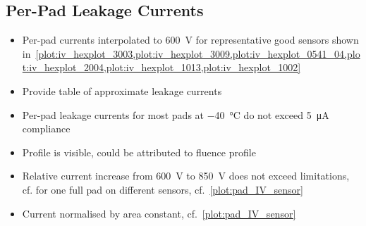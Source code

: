 \subsection{Per-Pad Leakage Currents}
\label{subsec:QA_Ipad}

\begin{itemize}
	\item Per-pad currents interpolated to \SI{600}{\volt} for representative good sensors shown in~\ref{plot:iv_hexplot_3003,plot:iv_hexplot_3009,plot:iv_hexplot_0541_04,plot:iv_hexplot_2004,plot:iv_hexplot_1013,plot:iv_hexplot_1002}
	\item Provide table of approximate leakage currents
	\item Per-pad leakage currents for most pads at \SI{-40}{\celsius} do not exceed \SI{5}{\micro\ampere} compliance
	\item Profile is visible, could be attributed to fluence profile
	\item Relative current increase from \SI{600}{\volt} to \SI{850}{\volt} does not exceed limitations, cf. for one full pad on different sensors, cf.~\ref{plot:pad_IV_sensor}
	\item Current normalised by area constant, cf.~\ref{plot:pad_IV_sensor}
\end{itemize}

